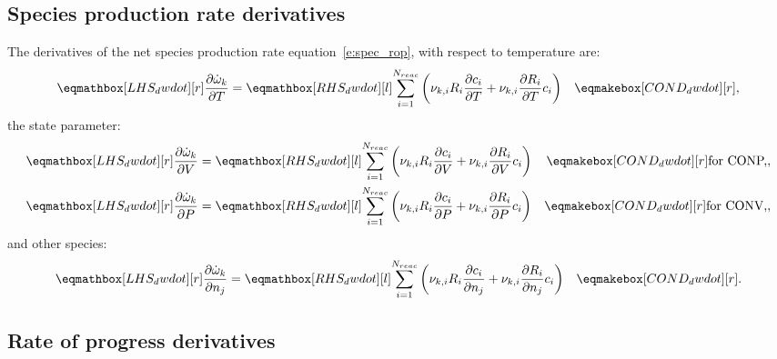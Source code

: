 \documentclass[12pt,number,sort&compress]{elsarticle}
\begin{document}
\subsection{Species production rate derivatives}
\label{s:d_spec_prod}
The derivatives of the net species production rate equation~\cref{e:spec_rop}, with respect to temperature are:
\begin{align}
 \label{e:dwdot_dT}
 \lhs{dwdot}{\frac{\partial \dot{\omega}_{k} }{\partial T }} &= \rhs{dwdot}{\sum_{i=1}^{\nr/} \left(\nu_{k,i} R_{i} \frac{\partial c_{i}}{\partial T } + \nu_{k,i} \frac{\partial R_{i}}{\partial T } c_{i}\right)} & \cond{dwdot}{,}
\end{align}
the state parameter:
\begin{subequations}
 \label{e:dwdot_de}
 \begin{align}
  \lhs{dwdot}{\frac{\partial \dot{\omega}_{k} }{\partial V }} &= \rhs{dwdot}{\sum_{i=1}^{\nr/} \left(\nu_{k,i} R_{i} \frac{\partial c_{i}}{\partial V } + \nu_{k,i} \frac{\partial R_{i}}{\partial V } c_{i}\right)} & \cond{dwdot}{\dconp/,}\\
  \lhs{dwdot}{\frac{\partial \dot{\omega}_{k} }{\partial P }} &= \rhs{dwdot}{\sum_{i=1}^{\nr/} \left(\nu_{k,i} R_{i} \frac{\partial c_{i}}{\partial P } + \nu_{k,i} \frac{\partial R_{i}}{\partial P } c_{i}\right)} & \cond{dwdot}{\dconv/,}
 \end{align}
\end{subequations}
and other species:
\begin{align}
 \label{e:dwdot_dnj}
 \lhs{dwdot}{\frac{\partial \dot{\omega}_{k} }{\partial {n_j} }} &= \rhs{dwdot}{\sum_{i=1}^{\nr/} \left(\nu_{k,i} R_{i} \frac{\partial c_{i} }{\partial {n_j} } + \nu_{k,i} \frac{\partial R_{i} }{\partial {n_j} } c_{i}\right)} & \cond{dwdot}{.}
\end{align}

\subsection{Rate of progress derivatives}
\label{s:dropi}
\end{document}

